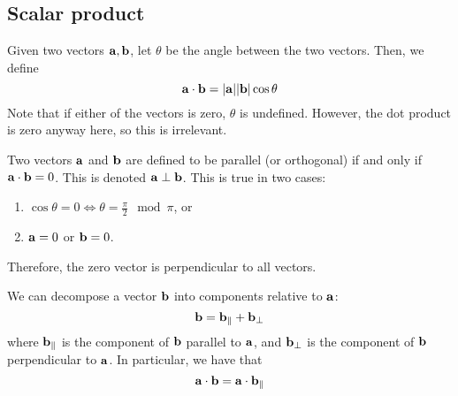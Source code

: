 \subsection{Scalar product}
\begin{definition}
	Given two vectors \(\vb a, \vb b\), let \(\theta\) be the angle between the two vectors.
	Then, we define
	\[
		\vb a \cdot \vb b = \abs{\vb a} \abs{\vb b} \cos \theta
	\]
	Note that if either of the vectors is zero, \(\theta\) is undefined.
	However, the dot product is zero anyway here, so this is irrelevant.
\end{definition}
\begin{definition}
	Two vectors \(\vb a\) and \(\vb b\) are defined to be parallel (or orthogonal) if and only if \(\vb a \cdot \vb b = 0\).
	This is denoted \(\vb a \perp \vb b\).
	This is true in two cases:
	\begin{enumerate}
		\item \(\cos \theta = 0 \iff \theta = \frac{\pi}{2} \mod \pi\), or
		\item \(\vb a = 0\) or \(\vb b = 0\).
	\end{enumerate}
	Therefore, the zero vector is perpendicular to all vectors.
\end{definition}
\begin{definition}
	We can decompose a vector \(\vb b\) into components relative to \(\vb a\):
	\[
		\vb b = \vb b_\parallel + \vb b_\perp
	\]
	where \(\vb b_\parallel\) is the component of \(\vb b\) parallel to \(\vb a\), and \(\vb b_\perp\) is the component of \(\vb b\) perpendicular to \(\vb a\).
	In particular, we have that
	\[
		\vb a \cdot \vb b = \vb a \cdot \vb b_\parallel
	\]
\end{definition}

